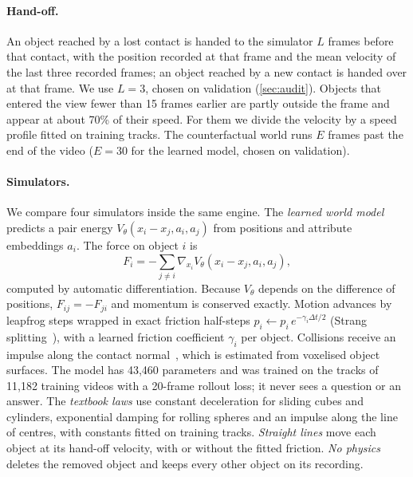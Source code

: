 \documentclass[10pt,twocolumn,letterpaper]{article}
\begin{document}
\paragraph{Hand-off.}
An object reached by a lost contact is handed to the simulator $L$ frames before that contact, with the position recorded at that frame and the mean velocity of the last three recorded frames; an object reached by a new contact is handed over at that frame.
We use $L=3$, chosen on validation (\cref{sec:audit}).
Objects that entered the view fewer than 15 frames earlier are partly outside the frame and appear at about 70\% of their speed.
For them we divide the velocity by a speed profile fitted on training tracks.
The counterfactual world runs $E$ frames past the end of the video ($E=30$ for the learned model, chosen on validation).

\paragraph{Simulators.}
We compare four simulators inside the same engine.
The \emph{learned world model} predicts a pair energy $V_\theta(x_i - x_j, a_i, a_j)$ from positions and attribute embeddings $a_i$.
The force on object $i$ is
\begin{equation}
F_i = -\sum_{j \neq i} \nabla_{x_i} V_\theta(x_i - x_j, a_i, a_j),
\end{equation}
computed by automatic differentiation.
Because $V_\theta$ depends on the difference of positions, $F_{ij} = -F_{ji}$ and momentum is conserved exactly.
Motion advances by leapfrog steps wrapped in exact friction half-steps $p_i \leftarrow p_i\, e^{-\gamma_i \Delta t/2}$ (Strang splitting~\cite{hairer2006geometric}), with a learned friction coefficient $\gamma_i$ per object.
Collisions receive an impulse along the contact normal~\cite{mirtich1995impulse}, which is estimated from voxelised object surfaces.
The model has 43,460 parameters and was trained on the tracks of 11,182 training videos with a 20-frame rollout loss; it never sees a question or an answer.
The \emph{textbook laws} use constant deceleration for sliding cubes and cylinders, exponential damping for rolling spheres and an impulse along the line of centres, with constants fitted on training tracks.
\emph{Straight lines} move each object at its hand-off velocity, with or without the fitted friction.
\emph{No physics} deletes the removed object and keeps every other object on its recording.
\end{document}
